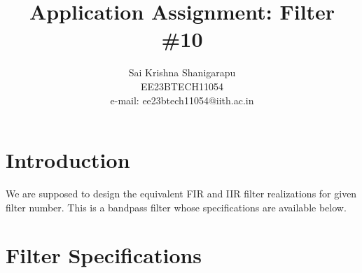 \documentclass{article}
\begin{document}
\title{ Application Assignment: Filter \#10}

\author{Sai Krishna Shanigarapu \\EE23BTECH11054\\ e-mail: ee23btech11054@iith.ac.in	}

\maketitle
\section{Introduction}
We are supposed to design the equivalent FIR and IIR filter realizations for given filter number.  
This is a bandpass filter whose specifications are available below.

\section{Filter Specifications}
\end{document}
